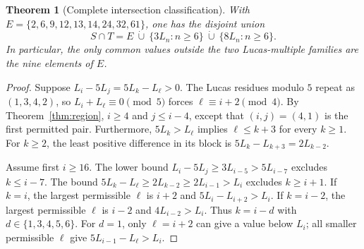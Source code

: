 \documentclass[11pt]{article}
\newtheorem{theorem}{Theorem}
\begin{document}
\begin{theorem}[Complete intersection classification]\label{thm:intersection}
With $E=\{2,6,9,12,13,14,24,32,61\}$, one has the disjoint union
\begin{equation}\label{eq:intersection}
\boxed{\quad S\cap T=E\ \dot\cup\
\{3L_n:n\ge6\}\ \dot\cup\ \{8L_n:n\ge6\}.\quad}
\end{equation}
In particular, the only common values outside the two Lucas-multiple
families are the nine elements of $E$.
\end{theorem}
\begin{proof}
Suppose $L_i-5L_j=5L_k-L_\ell>0$.
The Lucas residues modulo $5$ repeat as $(1,3,4,2)$, so
$L_i+L_\ell\equiv0\pmod5$ forces
$\ell\equiv i+2\pmod4$.
By Theorem~\ref{thm:region}, $i\ge4$ and $j\le i-4$, except
that $(i,j)=(4,1)$ is the first permitted pair. Furthermore,
$5L_k>L_\ell$ implies $\ell\le k+3$ for every $k\ge1$.
For $k\ge2$, the least positive difference in its block is
$5L_k-L_{k+3}=2L_{k-2}$.

Assume first $i\ge16$. The lower bound
$L_i-5L_j\ge3L_{i-5}>5L_{i-7}$ excludes $k\le i-7$.
The bound $5L_k-L_\ell\ge2L_{k-2}\ge2L_{i-1}>L_i$
excludes $k\ge i+1$. If $k=i$, the largest permissible
$\ell$ is $i+2$ and $5L_i-L_{i+2}>L_i$.
If $k=i-2$, the largest permissible $\ell$ is $i-2$ and
$4L_{i-2}>L_i$. Thus $k=i-d$ with $d\in\{1,3,4,5,6\}$.
For $d=1$, only $\ell=i+2$ can give a value below $L_i$;
all smaller permissible $\ell$ give $5L_{i-1}-L_\ell>L_i$.


\end{proof}
\end{document}
